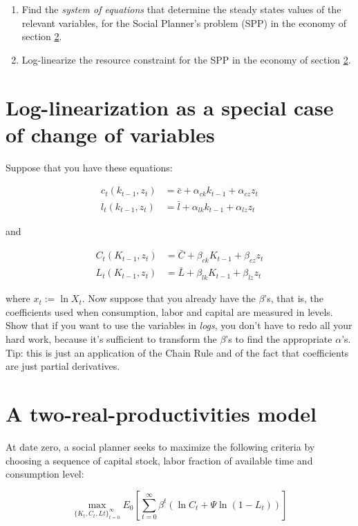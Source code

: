 \documentclass[11pt]{article}
\begin{document}
\begin{enumerate}
\item Find the \emph{system of equations} that determine the steady states values of the relevant variables, for the Social Planner's problem (SPP) in the economy of section \ref{sec:two-prod-model}.
\item Log-linearize the resource constraint for the SPP in the economy of section \ref{sec:two-prod-model}. 
\end{enumerate}

\section{Log-linearization as a special case of change of variables}

Suppose that you have these equations:

\begin{align}
c_t(k_{t-1}, z_t) & = \bar{c} + \alpha_{ck} k_{t-1} + \alpha_{cz} z_t \\
l_t(k_{t-1}, z_t) & = \bar{l} + \alpha_{lk} k_{t-1} + \alpha_{lz} z_t
\end{align}

and

\begin{align}
C_t(K_{t-1}, z_t) & = \bar{C} + \beta_{ck} K_{t-1} + \beta_{cz} z_t \\
L_t(K_{t-1}, z_t) & = \bar{L} + \beta_{lk} K_{t-1} + \beta_{lz} z_t
\end{align}

where $x_t := \ln X_t$. Now suppose that you already have the $\beta$'s, that is, the coefficients used when consumption, labor and capital are measured in levels. Show that if you want to use the variables in \emph{logs},  you don't have to redo all your hard work, because it's sufficient to transform the $\beta$'s to find the appropriate $\alpha$'s. Tip: this is just an application of the Chain Rule and of the fact that coefficients are just partial derivatives.


\section{A two-real-productivities  model}\label{sec:two-prod-model}

At date zero, a social planner seeks to maximize the following criteria  by choosing a sequence of capital stock, labor fraction of available time and consumption level: 

\[\max_{\{ K_t,C_t,Lt\}_{t=0}^{\infty}} E_0 \left[ \sum_{t=0}^{\infty} \beta^t \left( \ln C_t + \Psi \ln (1-L_t)\right) \right]    \]
\end{document}
